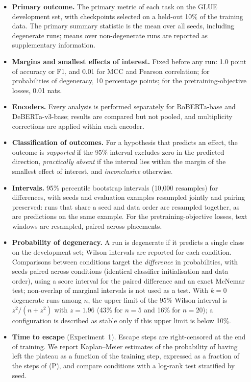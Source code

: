 \documentclass[10pt]{article}
\begin{document}
\begin{itemize}[leftmargin=*,itemsep=2pt]
\item \textbf{Primary outcome.} The primary metric of each task on the GLUE development set, with checkpoints selected on a held-out 10\% of the training data. The primary summary statistic is the mean over all seeds, including degenerate runs; means over non-degenerate runs are reported as supplementary information.
\item \textbf{Margins and smallest effects of interest.} Fixed before any run: 1.0 point of accuracy or F1, and 0.01 for MCC and Pearson correlation; for probabilities of degeneracy, 10 percentage points; for the pretraining-objective losses, 0.01 nats.
\item \textbf{Encoders.} Every analysis is performed separately for RoBERTa-base and DeBERTa-v3-base; results are compared but not pooled, and multiplicity corrections are applied within each encoder.
\item \textbf{Classification of outcomes.} For a hypothesis that predicts an effect, the outcome is \emph{supported} if the 95\% interval excludes zero in the predicted direction, \emph{practically absent} if the interval lies within the margin of the smallest effect of interest, and \emph{inconclusive} otherwise.
\item \textbf{Intervals.} 95\% percentile bootstrap intervals (10{,}000 resamples) for differences, with seeds and evaluation examples resampled jointly and pairing preserved: runs that share a seed and data order are resampled together, as are predictions on the same example. For the pretraining-objective losses, text windows are resampled, paired across placements.
\item \textbf{Probability of degeneracy.} A run is degenerate if it predicts a single class on the development set; Wilson intervals are reported for each condition. Comparisons between conditions target the \emph{difference} in probabilities, with seeds paired across conditions (identical classifier initialisation and data order), using a score interval for the paired difference and an exact McNemar test; non-overlap of marginal intervals is not used as a test. With $k=0$ degenerate runs among $n$, the upper limit of the 95\% Wilson interval is $z^2/(n+z^2)$ with $z=1.96$ (43\% for $n=5$ and 16\% for $n=20$); a configuration is described as stable only if this upper limit is below 10\%.
\item \textbf{Time to escape} (Experiment~1). Escape steps are right-censored at the end of training. We report Kaplan--Meier estimates of the probability of having left the plateau as a function of the training step, expressed as a fraction of the steps of (P), and compare conditions with a log-rank test stratified by seed.

\end{itemize}
\end{document}
